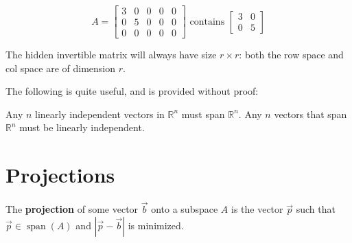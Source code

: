 \documentclass{article}
\DeclareMathOperator{\spn}{span}
\begin{document}
\begin{example}
    \[A =
    \begin{bmatrix}
        3& 0& 0& 0& 0 \\
        0& 5& 0& 0& 0 \\
        0& 0& 0& 0& 0   
    \end{bmatrix}
    \textrm{ contains }
    \begin{bmatrix}
        3& 0 \\
        0& 5
    \end{bmatrix}
    \]

    The hidden invertible matrix will always have size $r \times r$: both the row space and col space are of dimension $r$.
\end{example}

The following is quite useful, and is provided without proof:
\begin{theorem}
    Any $n$ linearly independent vectors in $\mathbb{R}^n$ must span $\mathbb{R}^n$.
    Any $n$ vectors that span $\mathbb{R}^n$ must be linearly independent.
\end{theorem}

\newpage

\section{Projections}
\begin{definition}[Projection]
    The \textbf{projection} of some vector $\vec{b}$ onto a subspace $A$ is the vector $\vec{p}$ such that $\vec{p} \in \spn(A)$ and $|\vec{p} - \vec{b}|$ is minimized.
\end{definition}
\end{document}
